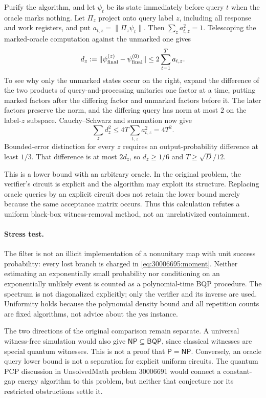 \documentclass[11pt,a4paper]{article}
\numberwithin{equation}{section}
\begin{document}
Purify the algorithm, and let $\psi_t$ be its state immediately before
query $t$ when the oracle marks nothing. Let $\Pi_z$ project onto query
label $z$, including all response and work registers, and put
$a_{t,z}=\|\Pi_z\psi_t\|$. Then $\sum_z a_{t,z}^2=1$.
Telescoping the marked-oracle computation against the unmarked one gives
\[
 d_z:=\|\psi^{(z)}_{\rm final}-\psi^{(0)}_{\rm final}\|
       \le 2\sum_{t=1}^T a_{t,z}.
\]
To see why only the unmarked states occur on the right, expand the
difference of the two products of query-and-processing unitaries one factor
at a time, putting marked factors after the differing factor and unmarked
factors before it. The later factors preserve the norm, and the differing
query has norm at most $2$ on the label-$z$ subspace.
Cauchy--Schwarz and summation now give
\[
 \sum_z d_z^2\le4T\sum_{t,z}a_{t,z}^2=4T^2.
\]
Bounded-error distinction for every $z$ requires an output-probability
difference at least $1/3$. That difference is at most $2d_z$, so
$d_z\ge1/6$ and $T\ge\sqrt D/12$.

This is a lower bound with an arbitrary oracle. In the original problem,
the verifier's circuit is explicit and the algorithm may exploit its
structure. Replacing oracle queries by an explicit circuit does not retain
the lower bound merely because the same acceptance matrix occurs. Thus this
calculation refutes a uniform black-box witness-removal method, not an
unrelativized containment.

\paragraph{Stress test.}
The filter is not an illicit implementation of a nonunitary map with unit
success probability: every lost branch is charged in
\eqref{eq:30006695:moment}. Neither estimating an exponentially small probability
nor conditioning on an exponentially unlikely event is counted as a
polynomial-time BQP procedure. The spectrum is not diagonalized explicitly;
only the verifier and its inverse are used. Uniformity holds because the
polynomial density bound and all repetition counts are fixed algorithms,
not advice about the yes instance.

The two directions of the original comparison remain separate. A universal
witness-free simulation would also give $\mathsf{NP}\subseteq\mathsf{BQP}$,
since classical witnesses are special quantum witnesses. This is not a proof
that $\mathsf P=\mathsf{NP}$. Conversely, an oracle query lower bound is
not a separation for explicit uniform circuits. The quantum PCP discussion
in UnsolvedMath problem 30006691 would connect a constant-gap energy algorithm to this problem,
but neither that conjecture nor its restricted obstructions settle it.
\end{document}
